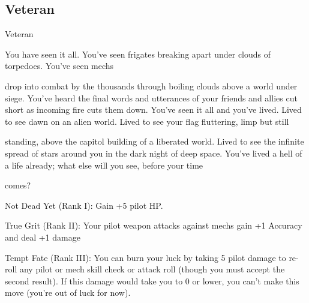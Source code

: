 \subsection{Veteran}

                                                     Veteran

You have seen it all. You’ve seen frigates breaking apart under clouds of torpedoes. You’ve seen mechs

drop into combat by the thousands through boiling clouds above a world under siege. You’ve heard the
final words and utterances of your friends and allies cut short as incoming fire cuts them down. You’ve seen
it all and you’ve lived. Lived to see dawn on an alien world. Lived to see your flag fluttering, limp but still

standing, above the capitol building of a liberated world. Lived to see the infinite spread of stars around you
in the dark night of deep space. You’ve lived a hell of a life already; what else will you see, before your time

comes?

Not Dead Yet (Rank I): Gain +5 pilot HP.





True Grit (Rank II): Your pilot weapon attacks against mechs gain +1 Accuracy and deal +1
damage

Tempt Fate (Rank III): You can burn your luck by taking 5 pilot damage to re-roll any pilot or
mech skill check or attack roll (though you must accept the second result). If this damage would
take you to 0 or lower, you can’t make this move (you’re out of luck for now).